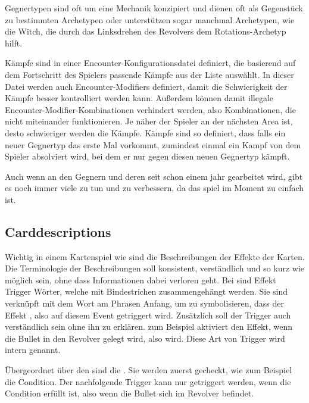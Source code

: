 Gegnertypen sind oft um eine Mechanik konzipiert und dienen oft als Gegenstück zu bestimmten Archetypen oder unterstützen
sogar manchmal Archetypen, wie \zB die Witch, die durch das Linksdrehen des Revolvers dem Rotations-Archetyp hilft.


Kämpfe sind in einer Encounter-Konfigurationsdatei definiert, die basierend auf dem Fortschritt des Spielers passende
Kämpfe aus der Liste auswählt. In dieser Datei werden auch Encounter-Modifiers definiert, damit die Schwierigkeit
der Kämpfe besser kontrolliert werden kann. Außerdem können damit illegale Encounter-Modifier-Kombinationen verhindert
werden, also Kombinationen, die nicht miteinander funktionieren. Je näher der Spieler an der nächsten Area ist,
desto schwieriger werden die Kämpfe. Kämpfe sind so definiert, dass falls ein neuer Gegnertyp das erste Mal vorkommt,
zumindest einmal ein Kampf von dem Spieler absolviert wird, bei dem er nur gegen diesen neuen Gegnertyp kämpft.


Auch wenn an den Gegnern und deren  seit schon einem jahr gearbeitet wird, gibt es noch immer viele
zu tun und zu verbessern, da das spiel im Moment zu einfach ist.



\subsection{Carddescriptions}\label{subsec:placementMatters}

Wichtig in einem Kartenspiel wie \FF sind die Beschreibungen der Effekte der Karten. Die Terminologie der Beschreibungen
soll konsistent, verständlich und so kurz wie möglich sein, ohne dass Informationen dabei verloren geht. Bei \FF sind
Effekt Trigger Wörter, welche mit Bindestrichen zusammengehängt werden. Sie sind verknüpft mit dem Wort  am Phrasen Anfang, um zu symbolisieren,
dass der Effekt , also auf diesem Event getriggert wird. Zusätzlich soll der Trigger auch verständlich sein ohne ihn zu erklären.
 zum Beispiel aktiviert den Effekt, wenn die Bullet in den Revolver gelegt wird, also  wird.
Diese Art von Trigger wird intern  genannt.


Übergeordnet über den  sind die .
Sie werden zuerst gecheckt, wie zum Beispiel die  Condition.
Der nachfolgende  Trigger kann nur getriggert werden, wenn die Condition erfüllt ist, also wenn die Bullet sich im Revolver befindet. %


